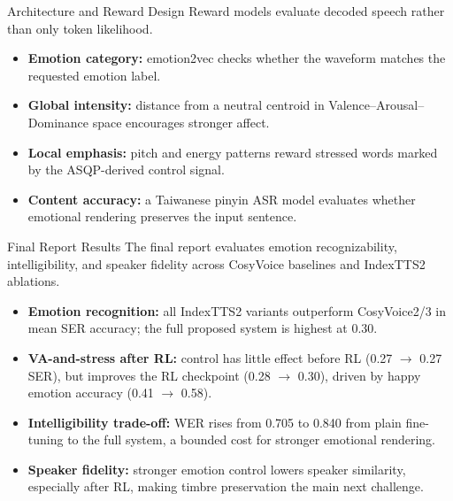 \documentclass[final,20pt]{beamer}
\newlength{\colwidth}
\begin{document}
\begin{frame}[t]
\begin{columns}[t]
\begin{column}{\colwidth}
\begin{block}{Architecture and Reward Design}
    Reward models evaluate decoded speech rather than only token likelihood.

    \begin{itemize}
      \item \textbf{Emotion category:} emotion2vec checks whether the waveform
      matches the requested emotion label.
      \item \textbf{Global intensity:} distance from a neutral centroid in
      Valence--Arousal--Dominance space encourages stronger affect.
      \item \textbf{Local emphasis:} pitch and energy patterns reward stressed
      words marked by the ASQP-derived control signal.
      \item \textbf{Content accuracy:} a Taiwanese pinyin ASR model evaluates
      whether emotional rendering preserves the input sentence.
    \end{itemize}
  \end{block}

  \begin{block}{Final Report Results}
    The final report evaluates emotion recognizability, intelligibility, and
    speaker fidelity across CosyVoice baselines and IndexTTS2 ablations.

    

    \begin{itemize}
      \item \textbf{Emotion recognition:} all IndexTTS2 variants outperform
      CosyVoice2/3 in mean SER accuracy; the full proposed system is highest
      at 0.30.
      \item \textbf{VA-and-stress after RL:} control has little effect before RL
      (0.27 $\rightarrow$ 0.27 SER), but improves the RL checkpoint
      (0.28 $\rightarrow$ 0.30), driven by happy emotion accuracy
      (0.41 $\rightarrow$ 0.58).
      \item \textbf{Intelligibility trade-off:} WER rises from 0.705 to 0.840
      from plain fine-tuning to the full system, a bounded cost for stronger
      emotional rendering.
      \item \textbf{Speaker fidelity:} stronger emotion control lowers speaker
      similarity, especially after RL, making timbre preservation the main next
      challenge.
    \end{itemize}
  \end{block}


\end{column}
\end{columns}
\end{frame}
\end{document}
